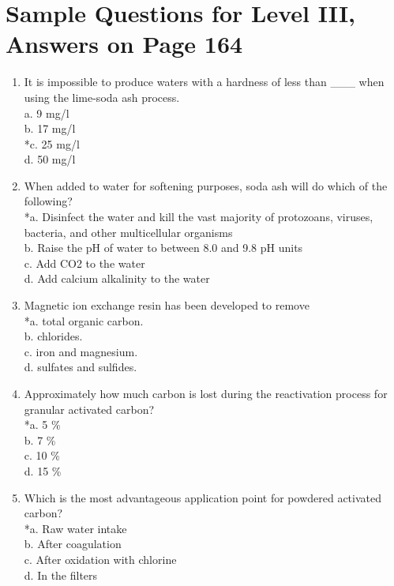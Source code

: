 \section{Sample Questions for Level III, Answers on Page 164}
\begin{enumerate}[label=TIII-\arabic*]
  \item It is impossible to produce waters with a hardness of less than \_\_\_ when using the lime-soda ash process.\\
a. 9 mg/l\\
b. 17 mg/l \\
*c. 25 mg/l \\
d. 50 mg/l \\
  \item When added to water for softening purposes, soda ash will do which of the following?\\
*a. Disinfect the water and kill the vast majority of protozoans, viruses, bacteria, and other multicellular organisms\\
b. Raise the pH of water to between 8.0 and 9.8 pH units\\
c. Add CO2 to the water\\
d. Add calcium alkalinity to the water\\
  \item Magnetic ion exchange resin has been developed to remove\\
*a. total organic carbon.\\
b. chlorides.\\
c. iron and magnesium.\\
d. sulfates and sulfides. 
  \item Approximately how much carbon is lost during the reactivation process for granular activated carbon?\\
*a. 5 \%\\
b. 7 \%\\
c. 10 \%\\
d. 15 \%\\
  \item Which is the most advantageous application point for powdered activated carbon?\\
*a. Raw water intake\\
b. After coagulation\\
c. After oxidation with chlorine\\
d. In the filters\\
\end{enumerate}
